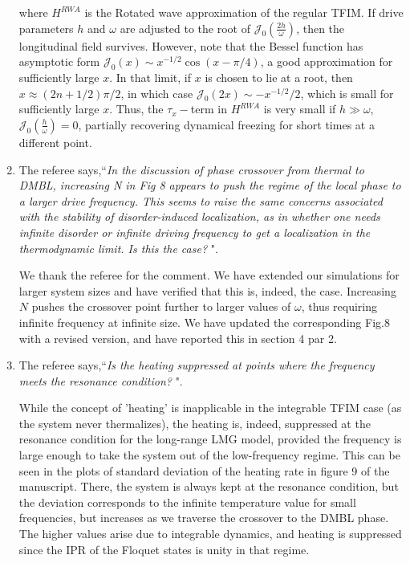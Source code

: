 \documentclass[aps,prb,reprint,showpacs,floatfix,superscriptaddress, onecolumn, nofootinbib, 9pt]{revtex4-2}
\newcommand{\response}[1]{{\color{blue}#1}} %
\begin{document}
\begin{enumerate}
{\begin{equation}
			\label{eq:tfim_sx1}
		\end{equation}
		where $H^{RWA}$ is the Rotated wave approximation of the regular TFIM. If drive parameters $h$ and $\omega$ are adjusted to the root of $\mathcal{J}_0\left(\frac{2h}{\omega}\right)$, then the longitudinal field survives. However, note that the Bessel function has asymptotic form $\mathcal{J}_0(x)\sim x^{-1/2}\cos(x-\pi/4)$, a good approximation for sufficiently  large $x$. In that limit, if $x$ is chosen to lie at a root, then $x\approx (2n+1/2)\pi/2$, in which case $\mathcal{J}_0(2x) \sim -x^{-1/2}/2$, which is small for sufficiently large $x$. Thus, the $\tau_x-$term in $H^{RWA}$ is very small if $h\gg\omega$, $\mathcal{J}_0\left(\frac{h}{\omega}\right)=0$, partially recovering dynamical freezing for short times at a different point.}

		\item The referee says,``\textit{In the discussion of phase crossover from thermal to DMBL, increasing N in Fig 8 appears to push the regime of the local phase to a larger drive frequency. This seems to raise the same concerns associated with the stability of disorder-induced localization, as in whether one needs infinite disorder or infinite driving frequency to
			get a localization in the thermodynamic limit. Is this the case? }".
		
		\response{    	
			We thank the referee for the comment. We have extended our simulations for larger system sizes and have verified that this is, indeed, the case. Increasing $N$ pushes the crossover point further to larger values of $\omega$, thus requiring infinite frequency at infinite size. We have updated the corresponding Fig.8 with a revised version, and have reported this in section 4 par 2.
		}
		\item The referee says,``\textit{Is the heating suppressed at points where the frequency meets the resonance condition? }".
		
		\response{
		While the concept of 'heating' is inapplicable in the integrable TFIM case (as the system never thermalizes), the heating is, indeed, suppressed at the resonance condition for the long-range LMG model, provided the frequency is large enough to take the system out of the low-frequency regime. This can be seen in the plots of standard deviation of the heating rate in figure 9 of the manuscript. There, the system is always kept at the resonance condition, but the deviation corresponds to the infinite temperature value for small frequencies, but increases as we traverse the crossover to the DMBL phase. The higher values arise due to integrable dynamics, and heating is suppressed since the IPR of the Floquet states is unity in that regime.}
		

\end{enumerate}
\end{document}
